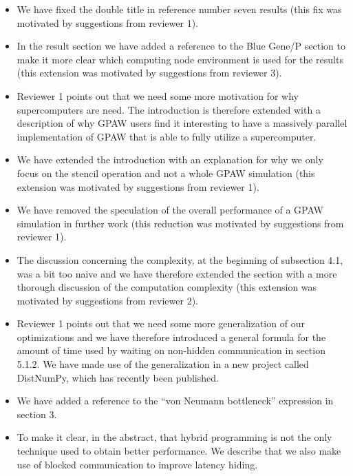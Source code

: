 \documentclass[preprint,3p,times]{elsarticle}
\begin{document}
\begin{itemize}
\item We have fixed the double title in reference number seven results (this fix was motivated by suggestions from reviewer 1).

\item In the result section we have added a reference to the Blue Gene/P section to make it more clear which computing node environment is used for the results (this extension was motivated by suggestions from reviewer 3).

\item Reviewer 1 points out that we need some more motivation for why supercomputers are need. The introduction is therefore extended with a description of why GPAW users find it interesting to have a massively parallel implementation of GPAW that is able to fully utilize a supercomputer.

\item We have extended the introduction with an explanation for why we only focus on the stencil operation and not a whole GPAW simulation (this extension was motivated by suggestions from reviewer 1).

\item We have removed the speculation of the overall performance of a GPAW simulation in further work (this reduction was motivated by suggestions from reviewer 1).

\item The discussion concerning the complexity, at the beginning of subsection 4.1, was a bit too naive and we have therefore extended the section with a more thorough discussion of the computation complexity (this extension was motivated by suggestions from reviewer 2).

\item Reviewer 1 points out that we need some more generalization of our optimizations and we have therefore introduced a general formula for the amount of time used by waiting on non-hidden communication in section 5.1.2. We have made use of the generalization in a new project called DistNumPy\cite{PGAS10}, which has recently been published.

\item We have added a reference to the ``von Neumann bottleneck'' expression in section 3.

\item To make it clear, in the abstract, that hybrid programming is not the only technique used to obtain better performance. We describe that we also make use of blocked communication to improve latency hiding.
\end{itemize}




\end{document}
